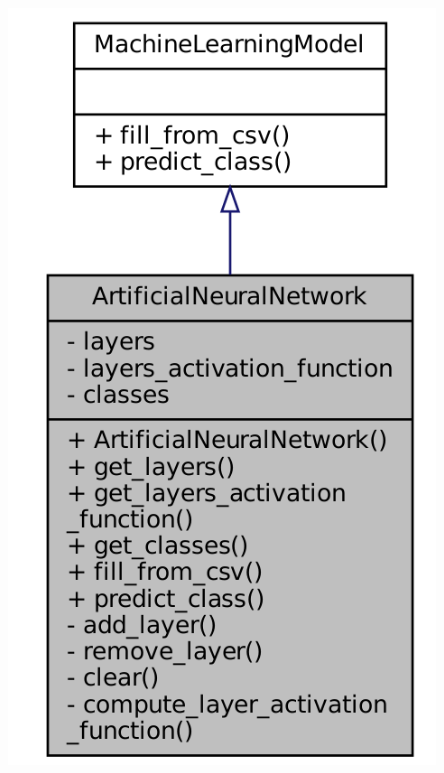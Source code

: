\documentclass[10pt]{article}
\begin{document}
\begin{minipage}[t]{0.3\linewidth}
\centering
\vspace{-2ex}
\includegraphics[width=0.85\textwidth]{ANNDiagram.png}
\end{minipage}
\end{document}
